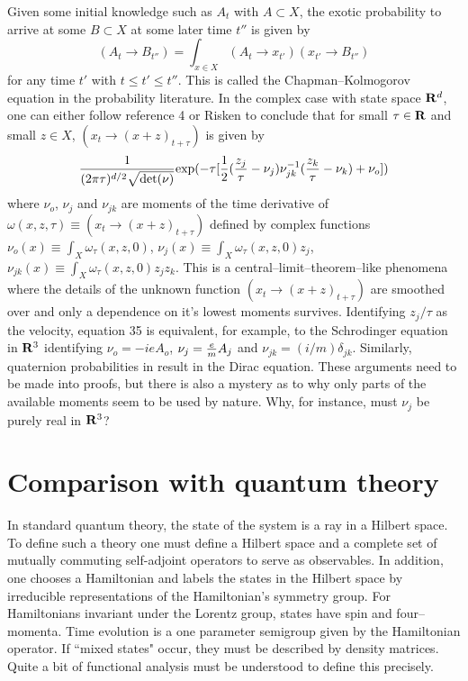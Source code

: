 \documentclass[12pt]{article}
\begin{document}
    Given some initial knowledge such as $A_t$ with $A\subset X$, the exotic probability
to arrive at some $B\subset X$ at some later time $t''$ is given by 
\begin{equation}
(A_t\rightarrow B_{t''}) = \int_{x\in X} (A_t\rightarrow x_{t'})(x_{t'}\rightarrow B_{t''})
\end{equation}
for any time $t'$ with $t\leq t'\leq t''$.
This is called the Chapman--Kolmogorov equation in the probability literature.
In the complex case with state space ${\bf R}^d$, one can either follow reference 4
or Risken\cite{risken} to conclude 
that for small $\tau\in {\bf R}$ and small $z\in X$, $(x_t\rightarrow (x+z)_{t+\tau})$ is given by 
\begin{equation}
{ {1}\over{(2\pi\tau)^{d/2}\sqrt{{\rm det}(\nu)} } }
{\rm exp}(-\tau[{{1}\over{2}}({{z_j}\over{\tau}} - \nu_j)\nu_{jk}^{-1}
({{z_k}\over{\tau}} - \nu_k)+\nu_o])
\end{equation}
where $\nu_o$, $\nu_j$ and $\nu_{jk}$ are moments of the time derivative of 
$\omega(x,z,\tau)\equiv(x_t\rightarrow (x+z)_{t+\tau})$
defined by complex functions 
$\nu_o(x)\equiv\int_X \omega_\tau(x,z,0)$, $\nu_j(x)\equiv\int_X \omega_\tau(x,z,0)z_j$,
$\nu_{jk}(x)\equiv\int_X\omega_\tau(x,z,0)z_j z_k$.  This is a central--limit--theorem--like 
phenomena where the details of the unknown function $(x_t\rightarrow (x+z)_{t+\tau})$ are smoothed
over and only a dependence on it's lowest moments survives.  Identifying $z_j/\tau$ as the velocity, 
equation 35 is equivalent, for example, to the Schrodinger equation in ${\bf R}^3$ identifying
$\nu_o=-ieA_o$, $\nu_j={{e}\over{m}} A_j$ and $\nu_{jk}=(i/m)\delta_{jk}$.
Similarly, quaternion probabilities in result in
the Dirac equation\cite{srinivasan1,srinivasan2}. 
These arguments need to be made into proofs, but
there is also a mystery as to why only parts of the available moments seem to be 
used by nature.  Why, for instance, must $\nu_j$ be purely real in ${\bf R}^3$?

\section{Comparison with quantum theory}

   In standard quantum theory, the state of the system is a ray in 
a Hilbert space.  To define such a theory one must define a Hilbert space
and a complete set of mutually commuting self-adjoint operators to serve 
as observables.  In addition, one chooses a Hamiltonian and labels the 
states in the Hilbert space by irreducible representations of the 
Hamiltonian's symmetry 
group.  For Hamiltonians invariant under the Lorentz group, states
have spin and four--momenta. Time evolution is a one parameter semigroup given by
the Hamiltonian operator.  If ``mixed states" occur, they must be described
by density matrices. Quite a bit of functional analysis must be 
understood to define this precisely.
\end{document}
